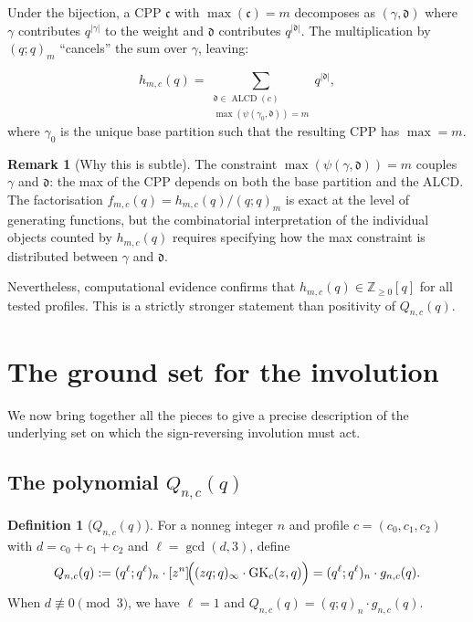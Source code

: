\documentclass[11pt]{article}
\newcommand{\Z}{\mathbb{Z}}
\newcommand{\GK}{\operatorname{GK}}
\newcommand{\ALCD}{\operatorname{ALCD}}
\newcommand{\qpoch}[2]{(#1;#2)_\infty}
\newcommand{\qpochn}[3]{(#1;#2)_{#3}}
\theoremstyle{plain}
\theoremstyle{definition}
\newtheorem{definition}[theorem]{Definition}
\newtheorem{remark}[theorem]{Remark}
\begin{document}
Under the bijection, a CPP $\mathfrak{c}$ with $\max(\mathfrak{c}) = m$
decomposes as $(\gamma, \mathfrak{d})$ where $\gamma$ contributes
$q^{|\gamma|}$ to the weight and $\mathfrak{d}$ contributes
$q^{|\mathfrak{d}|}$.  The multiplication by $\qpochn{q}{q}{m}$
``cancels'' the sum over $\gamma$, leaving:

\begin{equation}\label{eq:hmc-alcd}
  h_{m,c}(q) = \sum_{\substack{\mathfrak{d} \in \ALCD(c) \\
  \max(\psi(\gamma_0, \mathfrak{d})) = m}}
  q^{|\mathfrak{d}|},
\end{equation}
where $\gamma_0$ is the unique base partition such that the resulting
CPP has $\max = m$.

\begin{remark}[Why this is subtle]
The constraint $\max(\psi(\gamma, \mathfrak{d})) = m$ couples $\gamma$
and $\mathfrak{d}$: the max of the CPP depends on both the base
partition and the ALCD.  The factorisation
$f_{m,c}(q) = h_{m,c}(q)/\qpochn{q}{q}{m}$ is exact at the level of
generating functions, but the combinatorial interpretation of the
individual objects counted by $h_{m,c}(q)$ requires specifying how
the max constraint is distributed between $\gamma$ and $\mathfrak{d}$.

Nevertheless, computational evidence confirms that $h_{m,c}(q) \in
\Z_{\geq 0}[q]$ for all tested profiles.  This is a strictly stronger
statement than positivity of $Q_{n,c}(q)$.
\end{remark}


\section{The ground set for the involution}
\label{sec:ground-set}

We now bring together all the pieces to give a precise description of
the underlying set on which the sign-reversing involution must act.

\subsection{The polynomial $Q_{n,c}(q)$}

\begin{definition}[$Q_{n,c}(q)$]
\label{def:Q}
For a nonneg integer $n$ and profile $c = (c_0, c_1, c_2)$ with
$d = c_0 + c_1 + c_2$ and $\ell = \gcd(d, 3)$, define
\begin{equation}\label{eq:Q-def}
  Q_{n,c}(q) := \qpochn{q^\ell}{q^\ell}{n}
  \cdot [z^n]\!\Bigl(\qpoch{zq}{q} \cdot \GK_c(z,q)\Bigr)
  = \qpochn{q^\ell}{q^\ell}{n} \cdot g_{n,c}(q).
\end{equation}
When $d \not\equiv 0 \pmod{3}$, we have $\ell = 1$ and
$Q_{n,c}(q) = \qpochn{q}{q}{n} \cdot g_{n,c}(q)$.
\end{definition}
\end{document}
